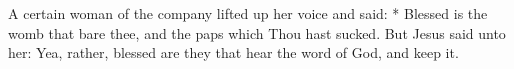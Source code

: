 A certain woman of the company lifted up her voice and said: * Blessed is the womb that bare thee, and the paps which Thou hast sucked. But Jesus said unto her: Yea, rather, blessed are they that hear the word of God, and keep it.





